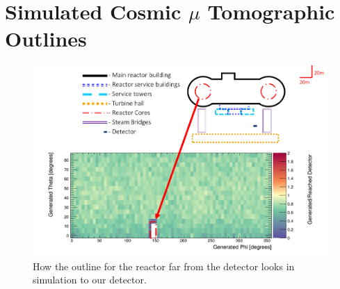 
\chapter{Simulated Cosmic $\mu$ Tomographic Outlines}

\newpage
\begin{figure}[htbp]
  \centering
  \begin{turn}{-90}
  \begin{minipage}{9in}
  \centering
    \includegraphics[scale = 0.8]{Chapter5/Figs/wylfaRasterNew/reactorCoreFarGen_Reached.png}
  \caption{How the outline for the reactor far from the detector looks in simulation to our detector.}
  \label{fig:reactorCoreFarGen_Reached}
  \end{minipage}
  \end{turn}
\end{figure}




